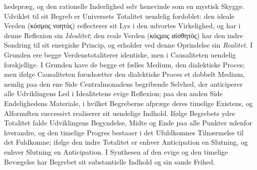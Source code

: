 \documentclass[12pt]{book}
\newcommand{\anm}[1]{\emph{\textbf{Anm.~#1.}}}
\begin{document}
hedspræg, og den rationelle Inderlighed selv hensvinde som en mystisk Skygge. Udviklet
til sit Begreb er Universets Totalitet uendelig fordoblet: den ideale Verden
(κόσμος νοητὸς) reflecterer sit Lys i den udvortes Virkelighed, og har i denne
Reflexion sin \emph{Idealitet}; den reale Verden (κόςμος αἰσθητὸς) har den indre
Sondring til sit energiske Princip, og erholder ved denne Oprindelse sin
\emph{Realitet.} I Grunden ere begge Verdenstotaliterer identiske, men i Causaliteten
uendelig forskjellige. I Grunden have de begge et fælles Medium, den dialektiske
Proces; men ifølge Causaliteten forudsætter den dialektiske Proces et dobbelt Medium,
nemlig paa den ene Side Centralmonadens begribende Selvhed, der anticiperer alle
Udviklingens Led i Idealitetens evige Reflexion; paa den anden Side Endelighedens
Materiale, i hvilket Begreberne afpræge deres timelige Existens, og Alfornuften
successivt realiserer sit uendelige Indhold. Ifølge Begrebets ydre Totalitet falde
Udviklingens Begyndelse, Midte og Ende paa alle Punkter udenfor hverandre, og den
timelige Progres bestaaer i det Ufuldkomnes Tilnærmelse til det Fuldkomne; ifølge den
indre Totalitet er enhver Anticipation en Slutning, og enhver Slutning en Anticipation.
I Synthesen af den evige og den timelige Bevægelse har Begrebet sit substantielle
Indhold og sin sande Frihed.
\end{document}
